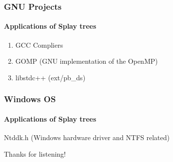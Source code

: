 \documentclass{beamer}
\theoremstyle{plain}
\begin{document}
    \begin{frame}
        \frametitle{GNU Projects}
        \framesubtitle{Applications of Splay trees}

        \begin{enumerate}
            \item GCC Compliers
            \item GOMP (GNU implementation of the OpenMP)
            \item libstdc++ (ext/pb\_ds)
        \end{enumerate}
    \end{frame}

    \begin{frame}
        \frametitle{Windows OS}
        \framesubtitle{Applications of Splay trees}
    
        Ntddk.h (Windows hardware driver and NTFS related)
    
    \end{frame}

    \begin{frame}
    
        \centering
        \huge Thanks for listening!
    
    \end{frame}

    
\end{document}
